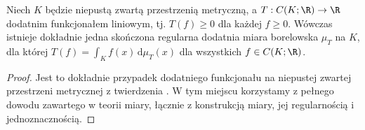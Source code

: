 \begin{lemat}
\label{lem:riesz-positive12}
Niech $K$ będzie niepustą zwartą przestrzenią metryczną,
a $T:C(K;\R)\to\R$ dodatnim funkcjonałem liniowym,
tj. $T(f)\ge0$ dla każdej $f\ge0$.
Wówczas istnieje dokładnie jedna skończona regularna dodatnia miara
borelowska $\mu_T$ na $K$, dla której
$T(f)=\int_Kf(x)\,\mathrm d\mu_T(x)$ dla wszystkich $f\in C(K;\R)$.
\end{lemat}
\begin{proof}
Jest to dokładnie przypadek dodatniego funkcjonału na niepustej
zwartej przestrzeni metrycznej z twierdzenia
.
W tym miejscu korzystamy z pełnego dowodu zawartego w teorii miary,
łącznie z konstrukcją miary, jej regularnością i jednoznacznością.
\end{proof}


